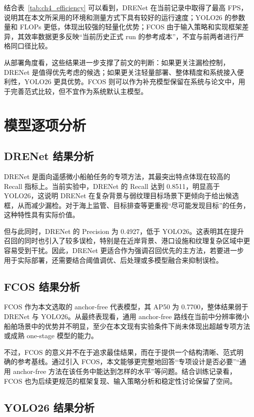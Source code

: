 结合表~\ref{tab:ch4_efficiency} 可以看到，DRENet 在当前记录中取得了最高 FPS，说明其在本文所采用的环境和测量方式下具有较好的运行速度；YOLO26 的参数量和 FLOPs 更低，体现出较强的轻量化优势；FCOS 由于输入策略和实现框架差异，其效率数据更多反映“当前历史正式 run 的参考成本”，不宜与前两者进行严格同口径比较。

从部署角度看，这些结果进一步支撑了前文的判断：如果更关注漏检控制，DRENet 是值得优先考虑的候选；如果更关注轻量部署、整体精度和系统接入便利性，YOLO26 更具优势。FCOS 则可以作为补充模型保留在系统与论文中，用于完善范式比较，但不宜作为系统默认主模型。

\section{模型逐项分析}

\subsection{DRENet 结果分析}

DRENet 是面向遥感微小船舶任务的专项方法，其最突出特点体现在较高的 Recall 指标上。当前实验中，DRENet 的 Recall 达到 0.8511，明显高于 YOLO26，这说明 DRENet 在复杂背景与弱纹理目标场景下更倾向于给出候选框，从而减少漏检。对于海上监管、目标排查等更重视“尽可能发现目标”的任务，这种特性具有实际价值。

但与此同时，DRENet 的 Precision 为 0.4927，低于 YOLO26。这表明其在提升召回的同时也引入了较多误检，特别是在近岸背景、港口设施和纹理复杂区域中更容易受到干扰。因此，DRENet 更适合作为强调召回优先的主方法，若要进一步用于实际部署，还需要结合阈值调优、后处理或多模型融合来抑制误检。

\subsection{FCOS 结果分析}

FCOS 作为本文选取的 anchor-free 代表模型，其 AP50 为 0.7700，整体结果弱于 DRENet 与 YOLO26。从最终表现看，通用 anchor-free 路线在当前中分辨率微小船舶场景中的优势并不明显，至少在本文现有实验条件下尚未体现出超越专项方法或成熟 one-stage 模型的能力。

不过，FCOS 的意义并不在于追求最佳结果，而在于提供一个结构清晰、范式明确的参考基线。通过引入 FCOS，本文能够更完整地回答“专项设计是否必要”“通用 anchor-free 方法在该任务中能达到怎样的水平”等问题。结合训练记录看，FCOS 也为后续更规范的框架复现、输入策略分析和稳定性讨论保留了空间。

\subsection{YOLO26 结果分析}

